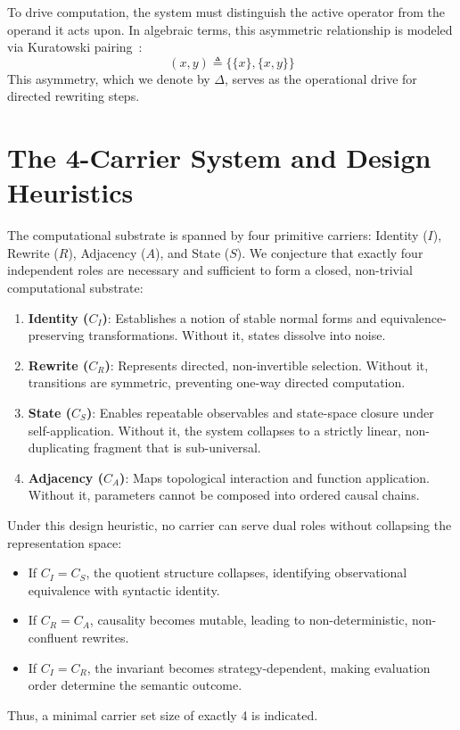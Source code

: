 \begin{axiom}
To drive computation, the system must distinguish the active operator from the operand it acts upon. In algebraic terms, this asymmetric relationship is modeled via Kuratowski pairing~\cite{kuratowski1921sur}:
$$(x, y) \triangleq \{\{x\}, \{x, y\}\}$$
This asymmetry, which we denote by $\Delta$, serves as the operational drive for directed rewriting steps.
\end{axiom}

\section{The 4-Carrier System and Design Heuristics}

The computational substrate is spanned by four primitive carriers: Identity ($I$), Rewrite ($R$), Adjacency ($A$), and State ($S$). We conjecture that exactly four independent roles are necessary and sufficient to form a closed, non-trivial computational substrate:

\begin{enumerate}
    \item \textbf{Identity ($C_I$)}: Establishes a notion of stable normal forms and equivalence-preserving transformations. Without it, states dissolve into noise.
    \item \textbf{Rewrite ($C_R$)}: Represents directed, non-invertible selection. Without it, transitions are symmetric, preventing one-way directed computation.
    \item \textbf{State ($C_S$)}: Enables repeatable observables and state-space closure under self-application. Without it, the system collapses to a strictly linear, non-duplicating fragment that is sub-universal.
    \item \textbf{Adjacency ($C_A$)}: Maps topological interaction and function application. Without it, parameters cannot be composed into ordered causal chains.
\end{enumerate}

Under this design heuristic, no carrier can serve dual roles without collapsing the representation space:
\begin{itemize}
    \item If $C_I = C_S$, the quotient structure collapses, identifying observational equivalence with syntactic identity.
    \item If $C_R = C_A$, causality becomes mutable, leading to non-deterministic, non-confluent rewrites.
    \item If $C_I = C_R$, the invariant becomes strategy-dependent, making evaluation order determine the semantic outcome.
\end{itemize}
Thus, a minimal carrier set size of exactly 4 is indicated.

